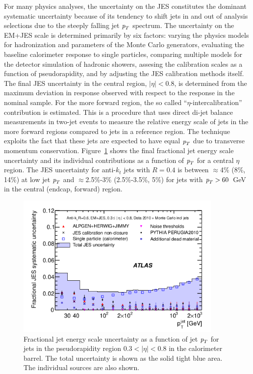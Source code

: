 For many physics analyses, the uncertainty on the JES constitutes the dominant systematic uncertainty because of its tendency to shift jets in and out of analysis selections due to the steeply falling jet ${\emph{p}_{T}}$ spectrum. The uncertainty on the EM+JES scale  is determined primarily by six factors:  varying the physics models for hadronization and parameters of the Monte Carlo generators, evaluating the baseline calorimeter response to single particles, comparing multiple models for the detector simulation of hadronic showers, assesing the calibration scales as a function of pseudorapidity, and by adjusting the JES calibration methods itself.  The final JES uncertainty in the central region, $|\eta| < 0.8$, is determined from the maximum deviation in response observed with respect to the response in the nominal sample.  For the more forward region, the so called ``$\eta$-intercalibration'' contribution is estimated. This is a procedure that uses direct di-jet balance measurements in two-jet events to measure the relative energy scale of jets in the more forward regions compared to jets in a reference region. The technique exploits the fact that these jets are expected to have equal ${\emph{p}_{T}}$ due to transverse momentum conservation. Figure~\ref{fig:JESuncertainty}  shows the final fractional jet energy scale uncertainty and its individual contributions as a function of ${\emph{p}_{T}}$ for a central $\eta$ region. The JES uncertainty for anti-$k_t$ jets with $R = 0.4$ is between $\approx$4\% (8\%, 14\%) at low jet ${\emph{p}_{T}}$ and $\approx$2.5\%-3\% (2.5\%-3.5\%, 5\%) for jets with ${\emph{p}_{T}} > 60$~GeV in the central (endcap, forward) region.

\begin{figure}[htbp]
  \begin{center}
   \includegraphics[width=0.9\textwidth]{JESUncertainty.png}
    \caption{Fractional jet energy scale uncertainty as a function of jet ${\emph{p}_{T}}$ for jets in the pseudorapidity region 0.3$ < |\eta| < $0.8 in the calorimeter barrel. The total uncertainty is shown as the solid tight blue area. The individual sources are also shown.}
    \label{fig:JESuncertainty}
  \end{center}
\end{figure}

